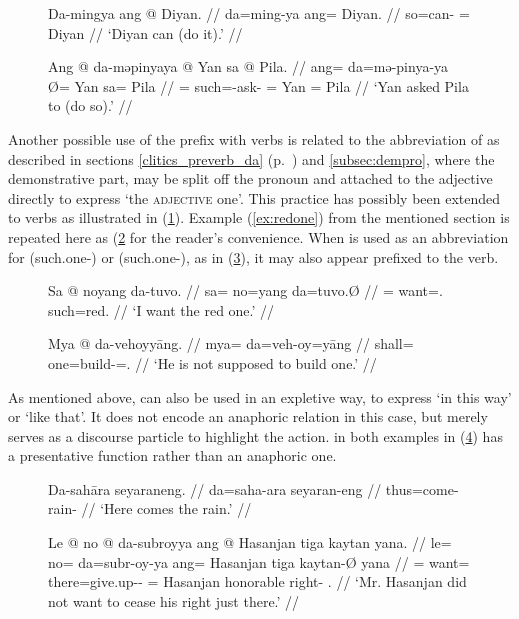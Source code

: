 \begin{figure}[h]
\pex\label{ex:daproverb}
\a\begingl
	\gla Da-mingya ang @ Diyan. //
	\glb da=ming-ya ang= Diyan. //
	\glc so=can-\TsgM{} \Aarg{}= Diyan //
	\glft `Diyan can (do it).' //
\endgl

\a\begingl
	\gla Ang @ da-məpinyaya {} @ Yan sa @ Pila. //
	\glb ang= da=mə-pinya-ya Ø= Yan sa= Pila //
	\glc \AgtT{}= such=\Pst{}-ask-\TsgM{} \Top{}= Yan \Parg{}= Pila //
	\glft `Yan asked Pila to (do so).' //
\endgl
\xe
\end{figure}

Another possible use of the prefix  with verbs is related to the
abbreviation of  as described in sections
\ref{clitics_preverb_da} (p.~\pageref{clitics_preverb_da}) and
\ref{subsec:dempro}, where the demonstrative part,  may be split
off the pronoun and attached to the adjective directly to express `the
\textsc{adjective} one'. This practice has possibly been extended to verbs as
illustrated in (\ref{ex:daproverb}). Example (\ref{ex:redone}) from the
mentioned section is repeated here as (\ref{ex:redone_2} for the reader's
convenience. When  is used as an abbreviation for
 (such.one-\Parg{}) or 
(such.one-\PargI{}), as in (\ref{ex:davb2}), it may also appear prefixed to the
verb.

\begin{figure}[h]
\ex\label{ex:redone_2}\begingl
	\gla Sa @ noyang da-tuvo. //
	\glb sa= no=yang da=tuvo.Ø //
	\glc \PatT{}= want=\Fsg{}.\Aarg{} such=red.\Top{} //
	\glft `I want the red one.' //
\endgl\xe
\end{figure}

\begin{figure}[h]
\ex\label{ex:davb2}\begingl
	\gla Mya @ da-vehoyyāng. //
	\glb mya= da=veh-oy=yāng //
	\glc shall= one=build-\Neg{}=\Tsg.\M{} //
	\glft `He is not supposed to build one.' //
\endgl\xe
\end{figure}

As mentioned above,  can also be used in an expletive way, to
express `in this way' or `like that'. It does not encode an anaphoric relation
in this case, but merely serves as a discourse particle to highlight the
action.  in both examples in (\ref{ex:daexpl}) has a presentative
function rather than an anaphoric one.

\begin{figure}[h]
\pex\label{ex:daexpl}
\a\begingl
	\gla Da-sahāra seyaraneng. //
	\glb da=saha-ara seyaran-eng //
	\glc thus=come-\TsgI{} rain-\AargI{} //
	\glft `Here comes the rain.' //
\endgl

\a\begingl
	\gla Le @ no @ da-subroyya ang @ Hasanjan tiga kaytan yana. //
	\glb le= no= da=subr-oy-ya ang= Hasanjan tiga kaytan-Ø yana //
	\glc \PatT{}= want= there=give.up-\Neg{}-\TsgM{} \Aarg{}= Hasanjan 
		honorable right-\Top{} \TsgM{}.\Gen{} //
	\glft `Mr. Hasanjan did not want to cease his right just there.' //
\endgl
\xe
\end{figure}

